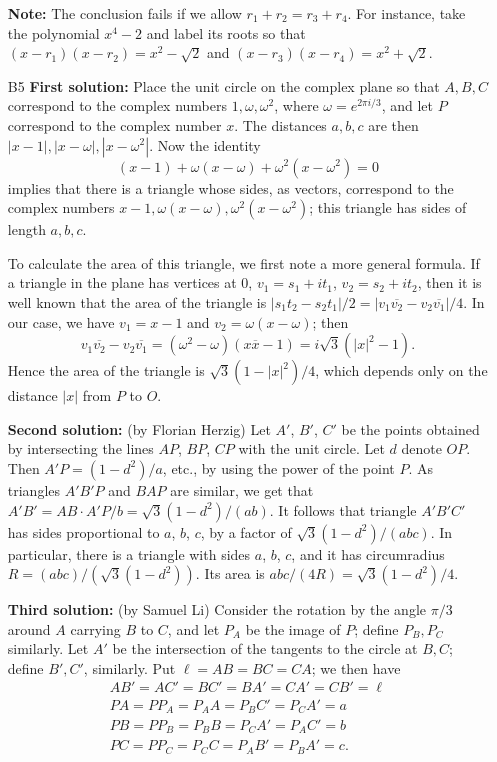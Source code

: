 \documentclass[amssymb,twocolumn,pra,10pt,aps]{revtex4-1}
\begin{document}
\begin{itemize}
\textbf{Note:} The conclusion fails if we allow
$r_1 + r_2 = r_3 + r_4$. For
instance, take the polynomial $x^4 - 2$ and label its roots so that
$(x-r_1)(x-r_2) = x^2 - \sqrt{2}$ and
$(x-r_3)(x-r_4) = x^2 + \sqrt{2}$.

\item[B5]
\textbf{First solution:}
Place the unit circle on the complex plane so that $A,B,C$ correspond
to the complex numbers $1,\omega,\omega^2$, where
$\omega=e^{2\pi i/3}$, and let $P$ correspond to the complex number
$x$. The distances $a,b,c$ are then $|x-1|,|x-\omega|,|x-\omega^2|$.
Now the identity
\[
(x-1) + \omega(x-\omega) + \omega^2(x-\omega^2) = 0
\]
implies that there is a triangle whose sides, as vectors, correspond
to the complex numbers $x-1, \omega(x-\omega), \omega^2(x-\omega^2)$;
this triangle has sides of length $a,b,c$.

To calculate the area of this triangle, we first note a more general
formula. If a triangle in the plane has vertices at $0$,
$v_1=s_1+it_1$, $v_2=s_2+it_2$, then it is well known that the area
of the triangle is $|s_1t_2-s_2t_1|/2 = |v_1\overline{v_2}-
v_2\overline{v_1}|/4$. In our case, we have $v_1 = x-1$
and $v_2 = \omega(x-\omega)$; then
\[
v_1\overline{v_2} - v_2\overline{v_1}
= (\omega^2-\omega)(x\overline{x}-1)
= i\sqrt{3}(|x|^2-1).
\]
Hence the area of the triangle is $\sqrt{3}(1-|x|^2)/4$, which depends
only on the distance $|x|$ from $P$ to $O$.

\textbf{Second solution:} (by Florian Herzig)
Let $A'$, $B'$, $C'$ be the points obtained by intersecting the lines
$AP$, $BP$, $CP$ with the unit circle. Let $d$ denote $OP$. Then $A'P =
(1-d^2)/a$, etc., by using the power of the point $P$. As triangles $A'B'P$
and $BAP$ are similar, we get that $A'B' = AB \cdot A'P/b = \sqrt 3
(1-d^2)/(ab)$. It follows that triangle $A'B'C'$ has sides proportional
to $a$, $b$, $c$, by a factor of $\sqrt 3 (1-d^2)/(abc)$. In particular,
there is a triangle with sides $a$, $b$, $c$, and it has circumradius $R =
(abc)/(\sqrt 3 (1-d^2))$. Its area is $abc/(4R) = \sqrt 3 (1-d^2)/4$.

\textbf{Third solution:} (by Samuel Li)
Consider the rotation by the angle $\pi/3$ around $A$ carrying $B$ to $C$, and let $P_A$ be the image of $P$;
define $P_B, P_C$ similarly.
Let $A'$ be the intersection of the tangents to the circle at $B, C$; define $B', C'$, similarly.
Put $\ell = AB = BC = CA$; we then have
\begin{gather*}
AB' = AC' = BC' = BA' = CA' = CB' = \ell \\
PA = PP_A = P_A A = P_B C' = P_C A' = a \\
PB = PP_B = P_B B = P_C A' = P_A C' = b \\
PC = PP_C = P_C C = P_A B' = P_B A' = c.
\end{gather*}


\end{itemize}
\end{document}
